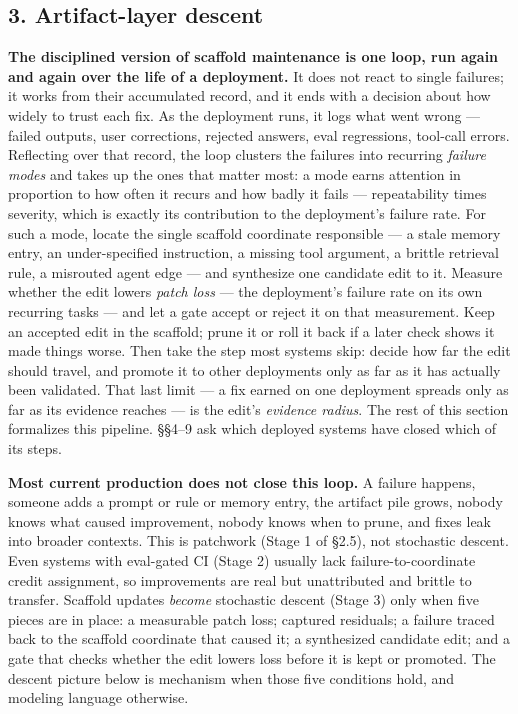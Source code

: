 \documentclass[
]{article}
\begin{document}
\subsection{3. Artifact-layer descent}\label{artifact-layer-descent}

\textbf{The disciplined version of scaffold maintenance is one loop, run
again and again over the life of a deployment.} It does not react to
single failures; it works from their accumulated record, and it ends
with a decision about how widely to trust each fix. As the deployment
runs, it logs what went wrong --- failed outputs, user corrections,
rejected answers, eval regressions, tool-call errors. Reflecting over
that record, the loop clusters the failures into recurring \emph{failure
modes} and takes up the ones that matter most: a mode earns attention in
proportion to how often it recurs and how badly it fails ---
repeatability times severity, which is exactly its contribution to the
deployment's failure rate. For such a mode, locate the single scaffold
coordinate responsible --- a stale memory entry, an under-specified
instruction, a missing tool argument, a brittle retrieval rule, a
misrouted agent edge --- and synthesize one candidate edit to it.
Measure whether the edit lowers \emph{patch loss} --- the deployment's
failure rate on its own recurring tasks --- and let a gate accept or
reject it on that measurement. Keep an accepted edit in the scaffold;
prune it or roll it back if a later check shows it made things worse.
Then take the step most systems skip: decide how far the edit should
travel, and promote it to other deployments only as far as it has
actually been validated. That last limit --- a fix earned on one
deployment spreads only as far as its evidence reaches --- is the edit's
\emph{evidence radius}. The rest of this section formalizes this
pipeline. §§4--9 ask which deployed systems have closed which of its
steps.

\textbf{Most current production does not close this loop.} A failure
happens, someone adds a prompt or rule or memory entry, the artifact
pile grows, nobody knows what caused improvement, nobody knows when to
prune, and fixes leak into broader contexts. This is patchwork (Stage 1
of §2.5), not stochastic descent. Even systems with eval-gated CI (Stage
2) usually lack failure-to-coordinate credit assignment, so improvements
are real but unattributed and brittle to transfer. Scaffold updates
\emph{become} stochastic descent (Stage 3) only when five pieces are in
place: a measurable patch loss; captured residuals; a failure traced
back to the scaffold coordinate that caused it; a synthesized candidate
edit; and a gate that checks whether the edit lowers loss before it is
kept or promoted. The descent picture below is mechanism when those five
conditions hold, and modeling language otherwise.
\end{document}
